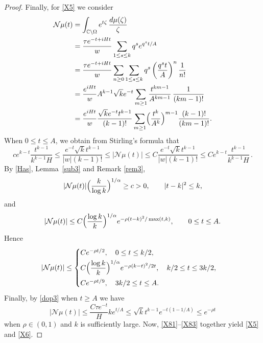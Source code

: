 \documentclass[11pt]{amsart}
\theoremstyle{definition}
\theoremstyle{remark}
\numberwithin{equation}{section}
\begin{document}
\begin{proof}
Finally, for \eqref{X5} we consider
\begin{align} \label{dop3}
{{\mathcal N}}\mu(t) &= \int_{\mathbb C \setminus \Omega}
e^{t\zeta}\,\frac{d\mu(\zeta)}{\zeta} \\&= \frac{\tau
e^{-t+iHt}}{w}\sum_{1 \le s \le k}q^se^{q^st/A}  \nonumber\\
 &= \frac{\tau e^{-t+iHt}}{w} \sum_{n\ge0}\sum_{1 \le s \le k} q^s \left( \frac{q^s t}{A} \right)^n\frac 1{n!} \nonumber \\
&= \frac{e^{iHt}}{w} A^{k-1} \sqrt{k} e^{-t} \sum_{m\ge1}\frac{t^{km-1}}{A^{km-1}}\, \frac 1{(km-1)!} \nonumber\\
&= \frac{e^{iHt}}{w} \frac{\sqrt{k} e^{-t} t^{k-1}}{(k-1)!} \sum_{m\ge1} \Bigl(\frac{t^k}{A^k}\Bigr)^{m-1}\frac{(k-1)!}{(km-1)!}. \nonumber
\end{align}
When $0 \le t \le A$, we obtain from Stirling's formula that
\begin{equation*}
c  e^{k-t}\frac{t^{k-1}}{k^{k-1}H} \le \frac{e^{-t}\sqrt{k}t^{k-1}}{|w|(k-1)!} \le |{{\mathcal N}}\mu(t)| \le C \frac{e^{-t} \sqrt{k} t^{k-1}}{|w| (k-1)!} \le C e^{k-t}\frac{t^{k-1}}{k^{k-1}H} \,.
\label{X8}
\end{equation*}
By \eqref{Has}, Lemma~\ref{sub3} and Remark \ref{rem3},
\begin{equation}
|{{\mathcal N}}\mu(t)| \Bigl(\frac {k}{\log k}\Bigr)^{1/\alpha}\ge c >0,\qquad
|t-k|^2\le k,
\label{X81}
\end{equation}
and
\begin{equation*}
|{{\mathcal N}}\mu(t)| \le C \Bigl(\frac {\log k}{k}\Bigr)^{1/\alpha}e^{-\rho (t-k)^2/\max(t,k)},\qquad 0 \le t \le A.
\end{equation*}
Hence
\begin{equation} \label{X82}
|{{\mathcal N}}\mu(t)| \le \begin{cases}  Ce^{-\rho t/2},\quad 0 \le t \le k/2,  \\[0.3 em]
C \Bigl(\dfrac {\log k}{k}\Bigr)^{1/\alpha} e^{-\rho (k-t)^2/2t}, \quad k/2 \le t \le 3k/2, \\[0.7 em]
Ce^{-\rho t/9}, \quad 3k/2 \le t \le A.
\end{cases}
\end{equation}
Finally, by \eqref{dop3} when $t \ge A$ we have
\begin{equation}
|{{\mathcal N}}\mu(t)|\le \frac{C\tau e^{-t}}{H} ke^{t/A} \le \sqrt{k} t^{k-1} e^{-t(1-1/A)} \le  e^{-\rho t}
\label{X83}
\end{equation}
when $\rho\in(0,1)$ and $k$ is sufficiently large.  Now, \eqref{X81}--\eqref{X83} together yield \eqref{X5} and \eqref{X6}.
\end{proof}
\end{document}

